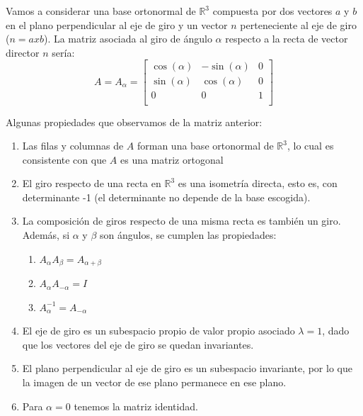 \documentclass[10pt,a4paper]{article}
\theoremstyle{mystyle}
\begin{document}
Vamos a considerar una base ortonormal de $\mathbb{R}^3$ compuesta por dos vectores $a$ y $b$ en el plano perpendicular al eje de giro y un vector $n$ perteneciente al eje de giro ($n = axb$). La matriz asociada al giro de ángulo $\alpha$ respecto a la recta de vector director $n$ sería:\\

\[
A=A_{\alpha}=
\begin{bmatrix}
\cos(\alpha) & -\sin(\alpha) & 0 \\
\sin(\alpha) &  \cos(\alpha)  & 0 \\
0 & 0 & 1 \\
\end{bmatrix}
\]


Algunas propiedades que observamos de la matriz anterior:\\ 

\begin{enumerate}
	\item 
	Las filas y columnas de $A$ forman una base ortonormal de $\mathbb{R}^3$, lo cual es consistente con que $A$ es una matriz ortogonal
	
	\item
	
	El giro respecto de una recta en $\mathbb{R}^3$ es una isometría directa, esto es, con determinante -1 (el determinante no depende de la base escogida).
	
	\item
	
	La composición de giros respecto de una misma recta es también un giro. Además, si $\alpha$ y $\beta$ son ángulos, se cumplen las propiedades:
	
	\begin{enumerate}
		\item
		$A_{\alpha} A_{\beta} = A_{\alpha+\beta}$
		\item
		$A_{\alpha} A_{-\alpha} = I $
		\item
		$A_{\alpha}^{-1} = A_{-\alpha}$
	\end{enumerate}
	
	\item
	
	El eje de giro es un subespacio propio de valor propio asociado $\lambda = 1$, dado que los vectores del eje de giro se quedan invariantes.
	
	\item
	
	El plano perpendicular al eje de giro es un subespacio invariante, por lo que la imagen de
	un vector de ese plano permanece en ese plano.
	
	\item
	
	Para $\alpha = 0$ tenemos la matriz identidad.
	
\end{enumerate}
\end{document}
